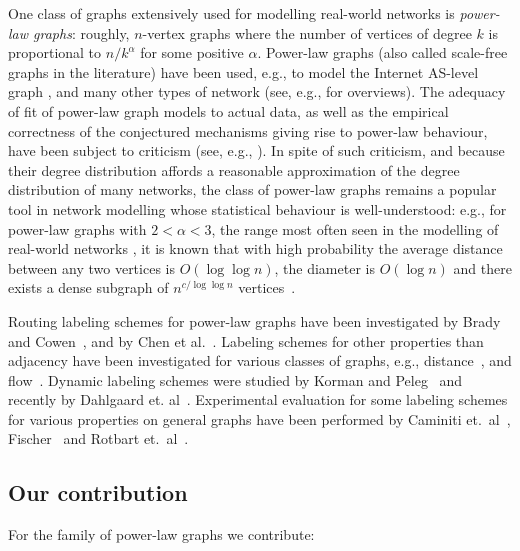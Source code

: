 One class of graphs extensively used for modelling real-world networks is \emph{power-law graphs}: roughly, $n$-vertex graphs where the number of vertices of degree $k$ is proportional to $n/k^{\alpha}$ for some positive $\alpha$. Power-law graphs (also called scale-free graphs in the literature) have been used, e.g., to model the Internet AS-level graph \cite{DBLP:journals/ton/SiganosFFF03,DBLP:conf/podc/AkellaCKS03}, and many other types of network (see, e.g., \cite{mitzenmacher2004brief,clauset2009power} for overviews). 
The adequacy of fit of power-law graph models to actual data, as well as the empirical correctness of the conjectured mechanisms giving rise to power-law behaviour, have been subject to criticism (see, e.g., \cite{DBLP:journals/jacm/AchlioptasCKM09,clauset2009power}). 
In spite of such criticism, and because their degree distribution affords a reasonable approximation of the degree distribution of many networks, the class of power-law graphs remains a popular tool in network modelling whose statistical behaviour is well-understood: e.g., for power-law graphs with $2<\alpha<3$, the range most often seen in the modelling of real-world networks \cite{clauset2009power}, it is known that with high probability the average distance between any two vertices is  $O(\log \log n)$, the diameter is $O(\log n)$ and there exists a dense subgraph of $n^{c/\log \log n}$ vertices~\cite{chung2004average}. 

Routing labeling schemes for power-law graphs  have been investigated by Brady and Cowen~\cite{brady2006compact}, and by Chen et al.~\cite{chen2012compact}. Labeling schemes for other properties than adjacency have been investigated for various classes of graphs, e.g., distance~\cite{gavoillea2004distance}, and flow~\cite{katz2004labeling}. 
Dynamic labeling schemes were studied by Korman and Peleg~\cite{korman2007compact,Korman07,korman2007general} and recently by Dahlgaard et. al~\cite{dahlgaard2014dynamic}.
Experimental evaluation for some labeling schemes for various properties on general graphs have been performed by Caminiti et.~al~\cite{caminiti2008engineering}, Fischer~\cite{fischer2009short} and Rotbart et.~al~\cite{rotbart2014evaluation}.


\subsection{Our contribution}
For the family of power-law graphs we contribute:
